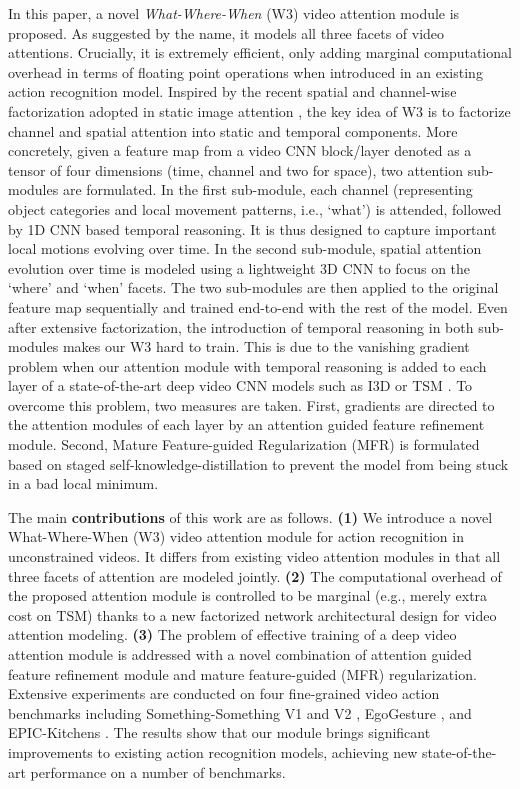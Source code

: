 \documentclass[runningheads]{llncs}
\makeatletter
\newcommand{\fullname}{What-Where-When}\newcommand{\shortname}{W3}\newcommand{\centered}[1]{\begin{tabular}{@{}l@{}} #1 \end{tabular}}
\makeatother
\begin{document}
In this paper, a novel {\em \fullname{}} (\shortname{}) video attention module is proposed. As suggested by the name, it models all three facets of video attentions. Crucially, it is extremely efficient, only adding marginal computational overhead in terms of floating point operations when 
introduced in an existing action recognition model. 
Inspired by the recent spatial and channel-wise factorization adopted in static image attention \cite{woo2018cbam}, 
the key idea of \shortname{} is to factorize channel and spatial attention into static and temporal components.
More concretely, given a feature map from a video CNN block/layer denoted as a tensor of four dimensions (time, channel and two for space), two attention sub-modules are formulated. 
In the first sub-module, each channel (representing object categories and  local movement patterns, i.e., `what') is attended, followed by 1D CNN based temporal reasoning. 
It is thus designed to capture important local motions evolving over time. In the second sub-module, spatial attention evolution over time is modeled using a lightweight 3D CNN to focus on the `where' and `when' facets. 
The two sub-modules are then applied to the original feature map sequentially and trained end-to-end with the rest of the model.  
Even after extensive factorization, the introduction of temporal reasoning in both sub-modules makes our \shortname{} hard to train. 
This is due to the vanishing gradient problem when our attention module with temporal reasoning is added to each layer of a state-of-the-art deep video CNN models such as I3D \cite{carreira2017quo} or TSM \cite{lin2019tsm}. 
To overcome this problem, two measures are taken. 
First,  gradients are  directed to the attention modules of each layer by an attention guided feature refinement module. 
Second, Mature Feature-guided Regularization (MFR) is formulated based on staged self-knowledge-distillation to prevent the model from being stuck in a bad local minimum.  




The main {\bf contributions} of this work are as follows. {\bf (1)}  We introduce a novel \fullname{} (\shortname{}) video attention module
for action recognition in unconstrained videos. It differs from existing video attention modules in that all three facets of attention are modeled jointly. {\bf (2)} The computational overhead of the proposed attention module is controlled to be marginal (e.g., merely  extra cost on TSM) thanks to a new factorized network architectural design for video attention modeling. {\bf (3)} The problem of effective training of a deep video attention module is addressed with a novel combination of attention guided feature refinement module and mature feature-guided (MFR) regularization. 
Extensive experiments are conducted on four fine-grained video action benchmarks including Something-Something V1 \cite{goyal2017something} and V2 \cite{mahdisoltani2018fine},
EgoGesture \cite{zhang2018egogesture}, and EPIC-Kitchens \cite{damen2018scaling}. The results show that our module brings significant improvements to existing action recognition models, achieving new state-of-the-art performance on a number of benchmarks.
\end{document}
